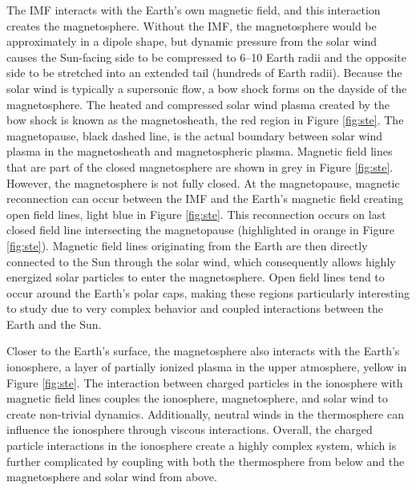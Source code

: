 The IMF interacts with the Earth's own magnetic field, and this interaction creates the magnetosphere.  Without the IMF, the magnetosphere would be approximately in a dipole shape, but dynamic pressure from the solar wind causes the Sun-facing side to be compressed to 6--10 Earth radii and the opposite side to be stretched into an extended tail (hundreds of Earth radii).  Because the solar wind is typically a supersonic flow, a bow shock forms on the dayside of the magnetosphere.  The heated and compressed solar wind plasma created by the bow shock is known as the magnetosheath, the red region in Figure \ref{fig:ste}.  The magnetopause, black dashed line, is the actual boundary between solar wind plasma in the magnetosheath and magnetospheric plasma.  Magnetic field lines that are part of the closed magnetosphere are shown in grey in Figure \ref{fig:ste}.  However, the magnetosphere is not fully closed.  At the magnetopause, magnetic reconnection can occur between the IMF and the Earth's magnetic field creating open field lines, light blue in Figure \ref{fig:ste}.  This reconnection occurs on last closed field line intersecting the magnetopause (highlighted in orange in Figure \ref{fig:ste}).  Magnetic field lines originating from the Earth are then directly connected to the Sun through the solar wind, which consequently allows highly energized solar particles to enter the magnetosphere.  Open field lines tend to occur around the Earth's polar caps, making these regions particularly interesting to study due to very complex behavior and coupled interactions between the Earth and the Sun.

Closer to the Earth's surface, the magnetosphere also interacts with the Earth's ionosphere, a layer of partially ionized plasma in the upper atmosphere, yellow in Figure \ref{fig:ste}.  The interaction between charged particles in the ionosphere with magnetic field lines couples the ionosphere, magnetosphere, and solar wind to create non-trivial dynamics.  Additionally,  neutral winds in the thermosphere can influence the ionosphere through viscous interactions.  Overall, the charged particle interactions in the ionosphere create a highly complex system, which is further complicated by coupling with both the thermosphere from below and the magnetosphere and solar wind from above.  

